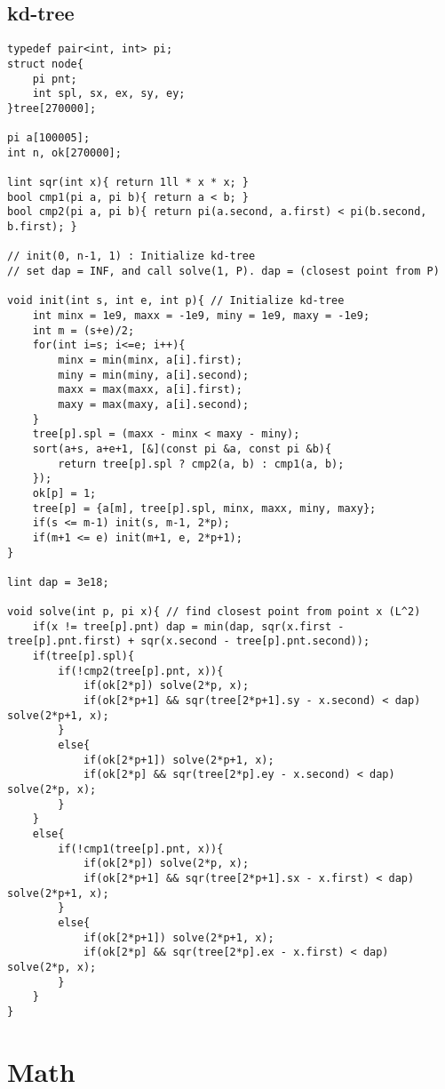 \documentclass[landscape, 10pt, a4paper, oneside,  twocolumn]{article}
\begin{document}
\subsection{kd-tree}
\begin{verbatim}
typedef pair<int, int> pi;
struct node{
	pi pnt;
	int spl, sx, ex, sy, ey;
}tree[270000];

pi a[100005];
int n, ok[270000];

lint sqr(int x){ return 1ll * x * x; }
bool cmp1(pi a, pi b){ return a < b; }
bool cmp2(pi a, pi b){ return pi(a.second, a.first) < pi(b.second, b.first); }

// init(0, n-1, 1) : Initialize kd-tree
// set dap = INF, and call solve(1, P). dap = (closest point from P)

void init(int s, int e, int p){ // Initialize kd-tree
	int minx = 1e9, maxx = -1e9, miny = 1e9, maxy = -1e9;
	int m = (s+e)/2;
	for(int i=s; i<=e; i++){
		minx = min(minx, a[i].first);
		miny = min(miny, a[i].second);
		maxx = max(maxx, a[i].first);
		maxy = max(maxy, a[i].second);
	}
	tree[p].spl = (maxx - minx < maxy - miny);
	sort(a+s, a+e+1, [&](const pi &a, const pi &b){
		return tree[p].spl ? cmp2(a, b) : cmp1(a, b);
	});
	ok[p] = 1;
	tree[p] = {a[m], tree[p].spl, minx, maxx, miny, maxy};
	if(s <= m-1) init(s, m-1, 2*p);
	if(m+1 <= e) init(m+1, e, 2*p+1);
}

lint dap = 3e18;

void solve(int p, pi x){ // find closest point from point x (L^2) 
	if(x != tree[p].pnt) dap = min(dap, sqr(x.first - tree[p].pnt.first) + sqr(x.second - tree[p].pnt.second));
	if(tree[p].spl){
		if(!cmp2(tree[p].pnt, x)){
			if(ok[2*p]) solve(2*p, x);
			if(ok[2*p+1] && sqr(tree[2*p+1].sy - x.second) < dap) solve(2*p+1, x);
		}
		else{
			if(ok[2*p+1]) solve(2*p+1, x);
			if(ok[2*p] && sqr(tree[2*p].ey - x.second) < dap) solve(2*p, x);
		}
	}
	else{
		if(!cmp1(tree[p].pnt, x)){
			if(ok[2*p]) solve(2*p, x);
			if(ok[2*p+1] && sqr(tree[2*p+1].sx - x.first) < dap) solve(2*p+1, x);
		}
		else{
			if(ok[2*p+1]) solve(2*p+1, x);
			if(ok[2*p] && sqr(tree[2*p].ex - x.first) < dap) solve(2*p, x);
		}
	}
}
\end{verbatim}

\section{Math}
\end{document}

